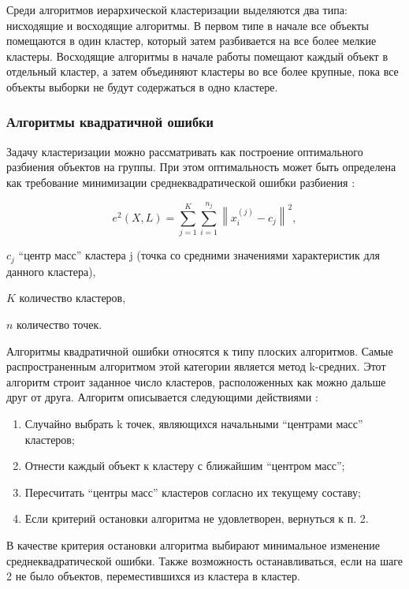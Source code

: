 Среди алгоритмов иерархической кластеризации выделяются два типа: нисходящие и восходящие алгоритмы. В первом типе в начале все объекты помещаются в один кластер, который затем разбивается на все более мелкие кластеры. Восходящие алгоритмы в начале работы помещают каждый объект в отдельный кластер, а затем объединяют кластеры во все более крупные, пока все объекты выборки не будут содержаться в одно кластере. \cite{clasters}

\subsubsection{Алгоритмы квадратичной ошибки}
Задачу кластеризации можно рассматривать как построение оптимального разбиения объектов на группы. При этом оптимальность может быть определена как требование минимизации среднеквадратической ошибки разбиения \cite{clasters}:

\begin{equation}
\label{eq:e2}
e^2\left(X,L\right)=\sum_{j=1}^{K}\sum_{i=1}^{n_j}\left \| x_i^{(j)}-c_j \right \|^2,
\end{equation}
\begin{eqexpl}[15mm]
\item{$c_j$} ``центр масс'' кластера j (точка со средними значениями характеристик для данного кластера),
\item{$K$} количество кластеров,
\item{$n$} количество точек.
\end{eqexpl}

Алгоритмы квадратичной ошибки относятся к типу плоских алгоритмов. Самые распространенным алгоритмом этой категории является метод k-средних. Этот алгоритм строит заданное число кластеров, расположенных как можно дальше друг от друга. Алгоритм описывается следующими действиями \cite{clasters}:

\begin{enumerate}[leftmargin=1.6\parindent]
\item Случайно выбрать k точек, являющихся начальными ``центрами масс'' кластеров;
\item Отнести каждый объект к кластеру с ближайшим ``центром масс'';
\item Пересчитать ``центры масс'' кластеров согласно их текущему составу;
\item Если критерий остановки алгоритма не удовлетворен, вернуться к п. 2.
\end{enumerate}

В качестве критерия остановки алгоритма выбирают минимальное изменение среднеквадратической ошибки. Также возможность останавливаться, если на шаге 2 не было объектов, переместившихся из кластера в кластер. \cite{clasters}

